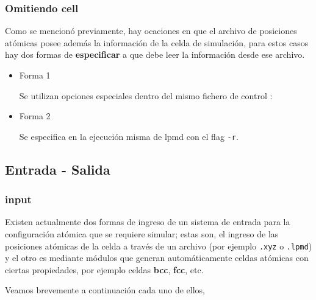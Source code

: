 \subsubsection{Omitiendo cell}
Como se mencion\'o previamente, hay ocaciones en que el archivo de posiciones at\'omicas posee adem\'as la informaci\'on de la celda de simulaci\'on, para estos casos hay dos formas de \textbf{especificar} a {\lpmd} que debe leer la informaci\'on desde ese archivo.

\begin{itemize} 
\item{Forma 1}

Se utilizan opciones especiales dentro del mismo fichero de control :


\item{Forma 2}

Se especifica en la ejecuci\'on misma de lpmd con el flag \verb|-r|.


\end{itemize}

\subsection{Entrada - Salida}

\subsubsection{input}

Existen actualmente dos formas de ingreso de un sistema de entrada para la configuraci\'on at\'omica que se requiere simular; estas son, el ingreso de las posiciones at\'omicas de la celda a trav\'es de un archivo (por ejemplo \verb|.xyz| o \verb|.lpmd|) y el otro es mediante m\'odulos que generan autom\'aticamente celdas at\'omicas con ciertas propiedades, por ejemplo celdas \textbf{bcc}, \textbf{fcc}, etc.

Veamos brevemente a continuaci\'on cada uno de ellos,

